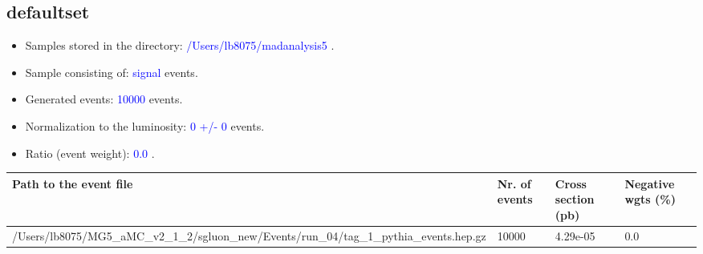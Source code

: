 \documentclass[a4paper, 11pt]{article}
\begin{document}
\subsection{ defaultset}

\begin{itemize}
  \item Samples stored in the directory: \textcolor{blue}{/\-Users/\-lb8075/\-madanalysis5} .
   \item Sample consisting of: \textcolor{blue}{signal}  events.
   \item Generated events: \textcolor{blue}{10000 }  events.
   \item Normalization to the luminosity: \textcolor{blue}{0}\textcolor{blue}{ +/\-- }\textcolor{blue}{0 }  events.
   \item Ratio (event weight): \textcolor{blue}{0.0 } .  
 
\end{itemize}
\begin{table}[!h]
  \begin{center}
    \begin{tabular}{|m{51.0mm}|m{24.0mm}|m{28.0mm}|m{28.0mm}|}
      \hline
      \cellcolor{yellow}         Path to the event file& \cellcolor{yellow}         Nr. of events& \cellcolor{yellow}         Cross section (pb)& \cellcolor{yellow}         Negative wgts (\%)\\
      \hline
      \cellcolor{white}          /\-Users/\-lb8075/\-MG5\_aMC\_v2\_1\_2/\-sgluon\_new/\-Events/\-run\_04/\-tag\_1\_pythia\_events.hep.gz& \cellcolor{white}          10000& \cellcolor{white}          4.29e-05& \cellcolor{white}          0.0\\
\hline
    \end{tabular}
  \end{center}
\end{table}
\end{document}
